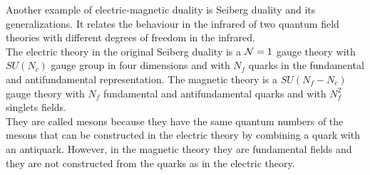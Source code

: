 Another example of electric-magnetic duality is Seiberg duality and its generalizations.
It relates the behaviour in the infrared of two quantum field theories with different degrees of freedom in the infrared.\\
The electric theory in the original Seiberg duality is a $\mathcal{N}=1$ gauge theory with $SU(N_c)$ gauge group in four dimensions and with $N_f$ quarks in the fundamental and antifundamental representation.
The magnetic theory is a $SU(N_f-N_c)$ gauge theory with $N_f$ fundamental and antifundamental quarks and with $N_f^2$ singlets fields. \\
They are called mesons because they have the same quantum numbers of the mesons that can be constructed in the electric theory by combining a quark with an antiquark. 
However, in the magnetic theory they are fundamental fields and they are not constructed from the quarks as in the electric theory.\\






